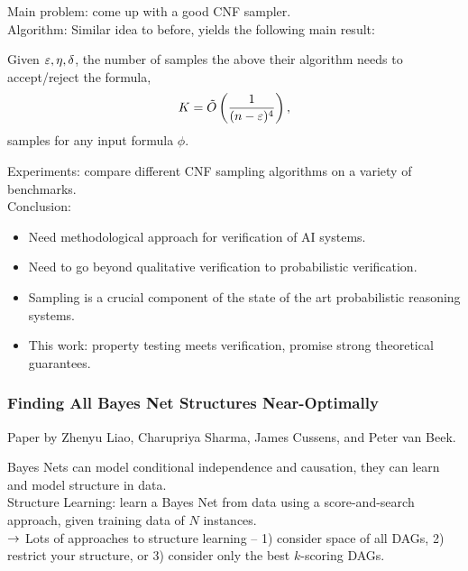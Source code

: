 Main problem: come up with a good CNF sampler. \\

Algorithm: Similar idea to before, yields the following main result:
\begin{theorem}
Given $\varepsilon, \eta, \delta$, the number of samples the above their algorithm needs to accept/reject the formula,
\[
K = \tilde{O}\left(\frac{1}{(n-\varepsilon)^4}\right),
\]
samples for any input formula $\phi$.
\end{theorem}

Experiments: compare different CNF sampling algorithms on a variety of benchmarks. \\

Conclusion:
\begin{itemize}
    \item Need methodological approach for verification of AI systems.
    \item Need to go beyond qualitative verification to probabilistic verification.
    \item Sampling is a crucial component of the state of the art probabilistic reasoning systems.
    \item This work: property testing meets verification, promise strong theoretical guarantees.
\end{itemize}




\spacerule
\subsubsection{Finding All Bayes Net Structures Near-Optimally~\cite{liao2018finding}}

Paper by Zhenyu Liao, Charupriya Sharma, James Cussens, and Peter van Beek. \\


Bayes Nets can model conditional independence and causation, they can learn and model structure in data. \\

Structure Learning: learn a Bayes Net from data using a score-and-search approach, given training data of $N$ instances. \\

$\rightarrow$ Lots of approaches to structure learning -- 1) consider space of all DAGs, 2) restrict your structure, or 3) consider only the best $k$-scoring DAGs.\\

